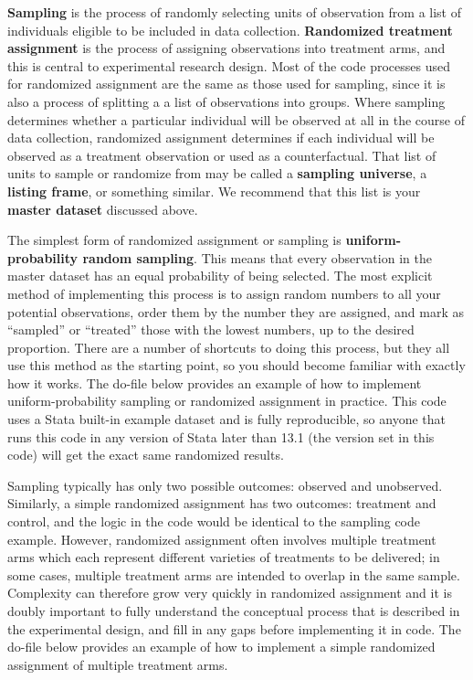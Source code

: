 \textbf{Sampling} is the process of randomly selecting units of observation
from a list of individuals eligible to be included in data collection.
\textbf{Randomized treatment assignment} is the process of assigning observations into treatment arms,
and this is central to experimental research design.
Most of the code processes used for randomized assignment are the same as those used for sampling,
since it is also a process of splitting a a list of observations into groups.
Where sampling determines whether a particular individual
will be observed at all in the course of data collection,
randomized assignment determines if each individual will be observed
as a treatment observation or used as a counterfactual.
That list of units to sample or randomize from may be called a \textbf{sampling universe},
a \textbf{listing frame}, or something similar.
We recommend that this list is your \textbf{master dataset} discussed above.

The simplest form of randomized assignment or sampling is 
\textbf{uniform-probability random sampling}.
This means that every observation in the master dataset
has an equal probability of being selected.
The most explicit method of implementing this process
is to assign random numbers to all your potential observations,
order them by the number they are assigned,
and mark as ``sampled'' or ``treated'' those with the lowest numbers, up to the desired proportion.
There are a number of shortcuts to doing this process,
but they all use this method as the starting point,
so you should become familiar with exactly how it works.
The do-file below provides an example of
how to implement uniform-probability sampling or randomized assignment in practice.
This code uses a Stata built-in example dataset and is fully reproducible,
so anyone that runs this code in any version of Stata later than 13.1
(the version set in this code)
will get the exact same randomized results.


Sampling typically has only two possible outcomes: observed and unobserved.
Similarly, a simple randomized assignment has two outcomes: treatment and control,
and the logic in the code would be identical to the sampling code example.
However, randomized assignment often involves multiple treatment arms
which each represent different varieties of treatments to be delivered;
in some cases, multiple treatment arms are intended to overlap in the same sample.
Complexity can therefore grow very quickly in randomized assignment
and it is doubly important to fully understand the conceptual process
that is described in the experimental design,
and fill in any gaps before implementing it in code.
The do-file below provides an example of how to implement
a simple randomized assignment of multiple treatment arms.

